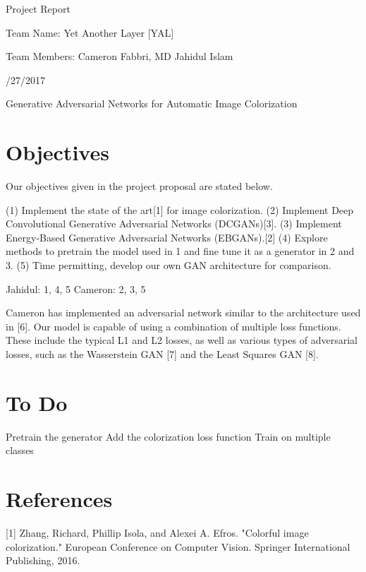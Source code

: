 \documentclass{article}
\begin{document}
\centerline{\sc \large Project Report}
\vspace{.5pc}
\centerline{\sc Team Name: Yet Another Layer [YAL]}
\centerline{\sc Team Members: Cameron Fabbri, MD Jahidul Islam}
\centerline{/27/2017}
\vspace{2pc}

\centerline{\sc \large Generative Adversarial Networks for Automatic Image Colorization }

\section{Objectives}
Our objectives given in the project proposal are stated below. 

\noindent (1) Implement the state of the art[1] for image colorization. \newline
\noindent (2) Implement Deep Convolutional Generative Adversarial Networks (DCGANs)[3]. \newline
\noindent (3) Implement Energy-Based Generative Adversarial Networks (EBGANs).[2] \newline
\noindent (4) Explore methods to pretrain the model used in 1 and fine tune it as a generator in 2 and 3.
\newline
\noindent (5) Time permitting, develop our own GAN architecture for comparison. \newline

\noindent Jahidul: 1, 4, 5 \newline
\noindent Cameron: 2, 3, 5 \newline

\noindent Cameron has implemented an adversarial network similar to the architecture used in [6]. Our model
is capable of using a combination of multiple loss functions. These include the typical L1 and L2 losses,
as well as various types of adversarial losses, such as the Wasserstein GAN [7] and the Least Squares GAN
[8]. 

\section{To Do}
Pretrain the generator
Add the colorization loss function
Train on multiple classes

\section{References}
[1] Zhang, Richard, Phillip Isola, and Alexei A. Efros. "Colorful image colorization." 
European Conference on Computer Vision. Springer International Publishing, 2016.
\vspace{2pt}
\end{document}
